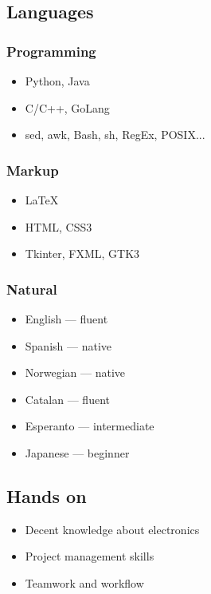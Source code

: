 \documentclass{curriculum}
\begin{document}
	\subsection{Languages}
	\begin{half}
		\subsubsection{Programming}
			\begin{itemize}
				\item Python, Java
				\item C/C++, GoLang
				\item sed, awk, Bash, sh, RegEx, POSIX...
			\end{itemize}
		\subsubsection{Markup}
			\begin{itemize}
				\item \LaTeX
				\item HTML, CSS3
				\item Tkinter, FXML, GTK3
			\end{itemize}
	\end{half}
	\begin{half}
		\subsubsection{Natural}
			\begin{itemize}
				\item English --- fluent
				\item Spanish --- native
				\item Norwegian --- native
				\item Catalan --- fluent
				\item Esperanto --- intermediate
				\item Japanese --- beginner
			\end{itemize}
	\end{half}

	\subsection{Hands on}
	\begin{itemize} 
		\item Decent knowledge about electronics
		\item Project management skills
		\item Teamwork and workflow
	\end{itemize}	
\end{document}
